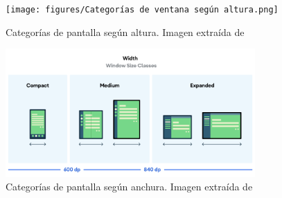 \begin{itemize}
                \begin{figure}[h]
                    \centering
                    \texttt{[image: figures/Categorías de ventana según altura.png]}
                    \caption[Categorías de pantalla según altura]
                    {Categorías de pantalla según altura. Imagen extraída de \cite{android_developers_window_nodate}}
                    \label{figure:material_design_3:height_classes}
                \end{figure}
                
                \begin{figure}[h]
                    \centering
                    \includegraphics[width=0.85\textwidth]{figures/Categorías de ventana según anchura.png}
                    \caption[Categorías de pantalla según anchura]
                    {Categorías de pantalla según anchura. Imagen extraída de \cite{android_developers_window_nodate}}
                    \label{figure:material_design_3:width_classes}
                \end{figure}


\end{itemize}
